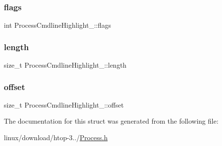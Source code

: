 \subsubsection{\texorpdfstring{flags}{flags}}
{\footnotesize\ttfamily int Process\+Cmdline\+Highlight\+\_\+\+::flags}

\mbox{\label{structProcessCmdlineHighlight___ae778dea81e07995db0a0a03e78c36eb9}} 
\subsubsection{\texorpdfstring{length}{length}}
{\footnotesize\ttfamily size\+\_\+t Process\+Cmdline\+Highlight\+\_\+\+::length}

\mbox{\label{structProcessCmdlineHighlight___a6734d27d349aa9219812edd7585cfa4b}} 
\subsubsection{\texorpdfstring{offset}{offset}}
{\footnotesize\ttfamily size\+\_\+t Process\+Cmdline\+Highlight\+\_\+\+::offset}



The documentation for this struct was generated from the following file\+:\begin{DoxyCompactItemize}
\item 
linux/download/htop-\/3../\hyperlink{Process_8h}{Process.\+h}\end{DoxyCompactItemize}
